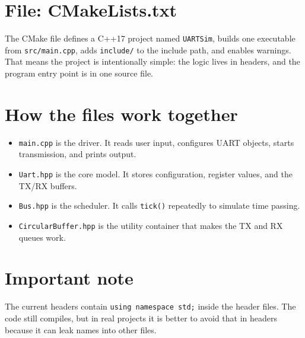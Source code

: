 \documentclass[11pt]{article}
\newcommand{\file}[1]{\texttt{#1}}
\begin{document}
\section*{File: CMakeLists.txt}
The CMake file defines a C++17 project named \texttt{UARTSim}, builds one executable from \file{src/main.cpp}, adds \file{include/} to the include path, and enables warnings. That means the project is intentionally simple: the logic lives in headers, and the program entry point is in one source file.

\section*{How the files work together}
\begin{itemize}[leftmargin=*]
  \item \file{main.cpp} is the driver. It reads user input, configures UART objects, starts transmission, and prints output.
  \item \file{Uart.hpp} is the core model. It stores configuration, register values, and the TX/RX buffers.
  \item \file{Bus.hpp} is the scheduler. It calls \texttt{tick()} repeatedly to simulate time passing.
  \item \file{CircularBuffer.hpp} is the utility container that makes the TX and RX queues work.
\end{itemize}

\section*{Important note}
The current headers contain \texttt{using namespace std;} inside the header files. The code still compiles, but in real projects it is better to avoid that in headers because it can leak names into other files.
\end{document}
